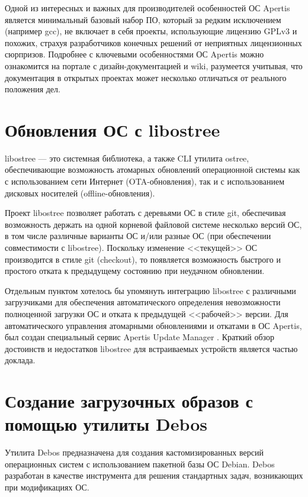 \documentclass[10pt, a5paper]{article}
\begin{document}
Одной из интересных и важных для производителей особенностей ОС Apertis является минимальный базовый набор ПО, который за редким исключением (например gcc), не включает в себя проекты, использующие лицензию GPLv3 и похожих, страхуя разработчиков конечных решений от неприятных лицензионных сюрпризов.
Подробнее с ключевыми особенностями ОС Apertis можно ознакомится на портале с дизайн-документацией\cite{bib3} и wiki\cite{bib4}, разумеется учитывая, что документация в открытых проектах может несколько отличаться от реального положения дел.

\section*{Обновления ОС с libostree}

libostree\cite{bib2} --- это системная библиотека, а также CLI утилита ostree, обеспечивающие возможность атомарных обновлений операционной системы как с использованием сети Интернет (OTA-обновления), так и с использованием дисковых носителей (offline-обновления).

Проект libostree позволяет работать с деревьями ОС в стиле git, обеспечивая возможность держать на одной корневой файловой системе несколько версий ОС, в том числе различные варианты ОС и/или разные ОС (при обеспечении совместимости с libostree). Поскольку изменение <<текущей>> ОС производится в стиле git \linebreak (checkout), то появляется возможность быстрого и простого отката к предыдущему состоянию при неудачном обновлении.

Отдельным пунктом хотелось бы упомянуть интеграцию libostree с различными загрузчиками для обеспечения автоматического определения невозможности полноценной загрузки ОС и отката к предыдущей <<рабочей>> версии. Для автоматического управления атомарными обновлениями и откатами в ОС Apertis, был создан специальный сервис Apertis Update Manager \cite{bib5}.
Краткий обзор достоинств и недостатков\cite{bib6} libostree для встраиваемых устройств является частью доклада.

\section*{Создание загрузочных образов с помощью утилиты Debos}

Утилита Debos\cite{bib7}\cite{bib8} предназначена для создания кастомизированных версий операционных систем с использованием пакетной базы ОС Debian. Debos разработан в качестве инструмента для решения стандартных задач, возникающих при модификациях ОС.
\end{document}
